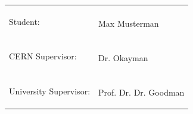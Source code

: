 \documentclass{article}
\newcommand{\StudentName}{Max Musterman}
\newcommand{\UniSupervisorName}{Prof. Dr. Dr. Goodman}
\newcommand{\CernSupervisorName}{Dr. Okayman}
\begin{document}
\renewcommand{\arraystretch}{5} 
\begin{table}[p!]
\begin{tabular}[t]{|m{6cm}|m{9cm}|}
\hline
\multirow{2}{*}{\hspace{1cm}Student:} & 

\\ 
\cline{2-2}
                         & \begin{center} {\large \StudentName } \end{center}  \\
\cline{1-2}
\multirow{2}{*}{\hspace{1cm}CERN Supervisor:} & 

\\ 
\cline{2-2}
                         &  \begin{center} {\large \CernSupervisorName } \end{center} \\
\cline{1-2}
\multirow{2}{*}{\hspace{1cm}University Supervisor:}   &   
 
\\ 
\cline{2-2}
                         &  \begin{center} {\large \UniSupervisorName }  \end{center}  \\ 
\hline
\end{tabular}
\end{table}

\pagebreak






\clearpage
\end{document}
